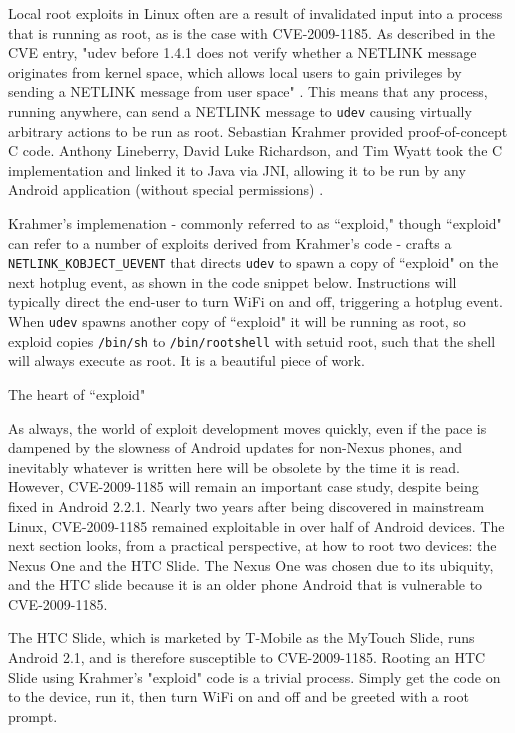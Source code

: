 Local root exploits in Linux often are a result of invalidated input into a process that is running as root, as is the case with CVE-2009-1185. 
As described in the CVE entry, "udev before 1.4.1 does not verify whether a NETLINK message originates from kernel space, which allows local users to gain privileges by sending a NETLINK message from user space" \cite{udevcve}. 
This means that any process, running anywhere, can send a NETLINK message to \texttt{udev} causing virtually arbitrary actions to be run as root. 
Sebastian Krahmer provided proof-of-concept C code.
Anthony Lineberry, David Luke Richardson, and Tim Wyatt took the C implementation and linked it to Java via JNI, allowing it to be run by any Android application (without special permissions) \cite{arentpermissions}.

Krahmer's implemenation - commonly referred to as ``exploid," though ``exploid" can refer to a number of exploits derived from Krahmer's code - crafts a \texttt{NETLINK\_KOBJECT\_UEVENT} that directs \texttt{udev} to spawn a copy of ``exploid" on the next hotplug event, as shown in the code snippet below. 
Instructions will typically direct the end-user to turn WiFi on and off, triggering a hotplug event. 
When \texttt{udev} spawns another copy of ``exploid" it will be running as root, so exploid copies \texttt{/bin/sh} to \texttt{/bin/rootshell} with setuid root, such that the shell will always execute as root. 
It is a beautiful piece of work.

\begin{table}

\caption{The heart of ``exploid"}
\label{tab:exploid}
\end{table}

As always, the world of exploit development moves quickly, even if the pace is dampened by the slowness of Android updates for non-Nexus phones, and inevitably whatever is written here will be obsolete by the time it is read. 
However, CVE-2009-1185 will remain an important case study, despite being fixed in Android 2.2.1.
Nearly two years after being discovered in mainstream Linux, CVE-2009-1185 remained exploitable in over half of Android devices.
The next section looks, from a practical perspective, at how to root two devices: the Nexus One and the HTC Slide. 
The Nexus One was chosen due to its ubiquity, and the HTC slide because it is an older phone Android that is vulnerable to CVE-2009-1185.

The HTC Slide, which is marketed by T-Mobile as the MyTouch Slide, runs Android 2.1, and is therefore susceptible to CVE-2009-1185. 
Rooting an HTC Slide using Krahmer's "exploid" code is a trivial process. 
Simply get the code on to the device, run it, then turn WiFi on and off and be greeted with a root prompt.

